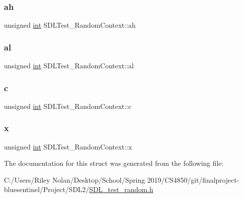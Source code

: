 \mbox{\label{struct_s_d_l_test___random_context_a2c8d2f1ee16cdfd38361b8f03b3fdb85}} 
\subsubsection{\texorpdfstring{ah}{ah}}
{\footnotesize\ttfamily unsigned \mbox{\hyperlink{warnings_8h_a74f207b5aa4ba51c3a2ad59b219a423b}{int}} S\+D\+L\+Test\+\_\+\+Random\+Context\+::ah}

\mbox{\label{struct_s_d_l_test___random_context_a0e2bccd3611d383d6510c6c828aa54c4}} 
\subsubsection{\texorpdfstring{al}{al}}
{\footnotesize\ttfamily unsigned \mbox{\hyperlink{warnings_8h_a74f207b5aa4ba51c3a2ad59b219a423b}{int}} S\+D\+L\+Test\+\_\+\+Random\+Context\+::al}

\mbox{\label{struct_s_d_l_test___random_context_a17a6a7e7b68a33c67d9b74c8c7c33198}} 
\subsubsection{\texorpdfstring{c}{c}}
{\footnotesize\ttfamily unsigned \mbox{\hyperlink{warnings_8h_a74f207b5aa4ba51c3a2ad59b219a423b}{int}} S\+D\+L\+Test\+\_\+\+Random\+Context\+::c}

\mbox{\label{struct_s_d_l_test___random_context_a8bd6d1b4e1677ed1c06f5cc09f1af5b6}} 
\subsubsection{\texorpdfstring{x}{x}}
{\footnotesize\ttfamily unsigned \mbox{\hyperlink{warnings_8h_a74f207b5aa4ba51c3a2ad59b219a423b}{int}} S\+D\+L\+Test\+\_\+\+Random\+Context\+::x}



The documentation for this struct was generated from the following file\+:\begin{DoxyCompactItemize}
\item 
C\+:/\+Users/\+Riley Nolan/\+Desktop/\+School/\+Spring 2019/\+C\+S4850/git/finalproject-\/bluesentinel/\+Project/\+S\+D\+L2/\mbox{\hyperlink{_s_d_l__test__random_8h}{S\+D\+L\+\_\+test\+\_\+random.\+h}}\end{DoxyCompactItemize}
